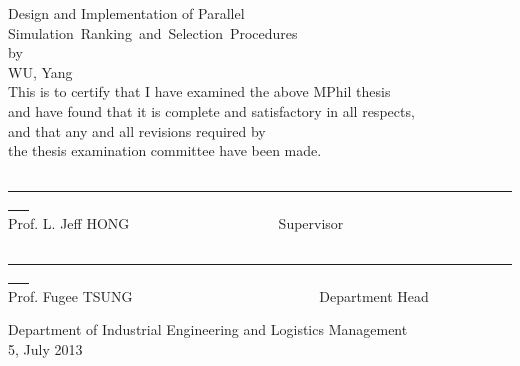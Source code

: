 \begin{center}
{\Large Design and Implementation of Parallel Simulation~Ranking~and~Selection~Procedures}\\
\vspace{23mm}
by\\
\vspace{3mm}
WU, Yang\\
\vspace{5mm}
This is to certify that I have examined the above MPhil thesis\\
and have found that it is complete and satisfactory in all respects,\\
and that any and all revisions required by\\
the thesis examination committee have been made.
\end{center}

\vspace{20mm}

\begin{center}
\underline{~~~~~~~~~~~~~~~~~~~~~~~~~~~~~~~~~~~~~~~~~~~~~~~~~~~~~~~~~~~~~~~~~~~~~~~~~~~ }\\
Prof. L. Jeff HONG ~~~~~~~~~~~~~~~~~~~~ Supervisor
\end{center}

\vspace{20mm}

\begin{center}
\underline{~~~~~~~~~~~~~~~~~~~~~~~~~~~~~~~~~~~~~~~~~~~~~~~~~~~~~~~~~~~~~~~~~~~~~~~~~~~ }\\
Prof. Fugee TSUNG ~~~~~~~~~~~~~~~~~~~~~~~~~~Department Head
\end{center}
\vspace{15mm}
\begin{center}
Department of Industrial Engineering and Logistics Management\\
\vspace{5mm} 5, July 2013
\end{center}
